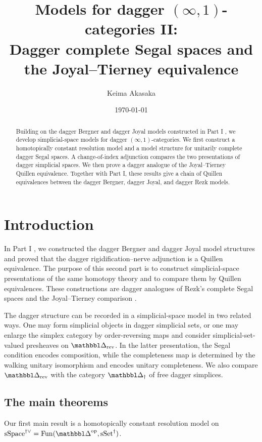 \documentclass[a4paper,dvipdfmx,11pt]{amsart}
\title[Models for dagger $(\infty,1)$-categories II]{Models for dagger $(\infty,1)$-categories II:\\Dagger complete Segal spaces and the Joyal--Tierney equivalence}
\author{Keima Akasaka}
\date{\today}
\begin{document}
\begin{abstract}
  Building on the dagger Bergner and dagger Joyal models constructed in Part I \cite{Aka26}, we develop simplicial-space models for dagger $(\infty,1)$-categories.
  We first construct a homotopically constant resolution model and a model structure for unitarily complete dagger Segal spaces.
  A change-of-index adjunction compares the two presentations of dagger simplicial spaces.
  We then prove a dagger analogue of the Joyal--Tierney Quillen equivalence.
  Together with Part I, these results give a chain of Quillen equivalences between the dagger Bergner, dagger Joyal, and dagger Rezk models.
\end{abstract}

\maketitle
\setcounter{tocdepth}{1}
\tableofcontents


\section{Introduction}

In Part I \cite{Aka26}, we constructed the dagger Bergner and dagger Joyal model structures and proved that the dagger rigidification--nerve adjunction is a Quillen equivalence.
The purpose of this second part is to construct simplicial-space presentations of the same homotopy theory and to compare them by Quillen equivalences.
These constructions are dagger analogues of Rezk's complete Segal spaces and the Joyal--Tierney comparison \cite{Rez01,JT06}.

The dagger structure can be recorded in a simplicial-space model in two related ways.
One may form simplicial objects in dagger simplicial sets, or one may enlarge the simplex category by order-reversing maps and consider simplicial-set-valued presheaves on $\prism_{\rev}$.
In the latter presentation, the Segal condition encodes composition, while the completeness map is determined by the walking unitary isomorphism and encodes unitary completeness.
We also compare $\prism_{\rev}$ with the category $\prism_{\dag}$ of free dagger simplices.

\subsection*{The main theorems}

Our first main result is a homotopically constant resolution model on $\sSpace^{\dag\vee}=\Fun(\prism^{\myop},\sSet^{\dag})$.
\end{document}
